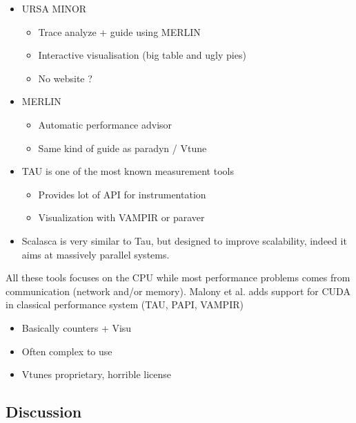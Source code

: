 \begin{itemize}
\begin{itemize}
        \end{itemize}
    \item URSA MINOR \cite{Park00Supporting}
        \begin{itemize}
            \item Trace analyze + guide using MERLIN\cite{Kim01Performance}
            \item Interactive visualisation (big table and ugly pies)
            \item No website ?
        \end{itemize}
    \item MERLIN \cite{Kim01Performance}
        \begin{itemize}
            \item Automatic performance advisor
            \item Same kind of guide as paradyn \cite{Miller95Paradyn} /
                Vtune \cite{Reinders05VTune}
        \end{itemize}
    \item TAU \cite{Shende06Tau} is one of the most known measurement tools
        \begin{itemize}
            \item Provides lot of API for instrumentation
            \item Visualization with VAMPIR or paraver
        \end{itemize}
    \item Scalasca \cite{Geimer10Scalasca} is very similar to Tau, but
        designed to improve scalability, indeed it aims at massively parallel
        systems.
\end{itemize}

All these tools focuses on the CPU while most performance problems comes from
communication (network and/or memory).
Malony et al. \cite{Malony11Parallel} adds support for CUDA in classical
performance system (TAU, PAPI, VAMPIR)

\begin{itemize}
    \item Basically counters + Visu
    \item Often complex to use
    \item Vtunes proprietary, horrible license
\end{itemize}

\subsection{Discussion}

